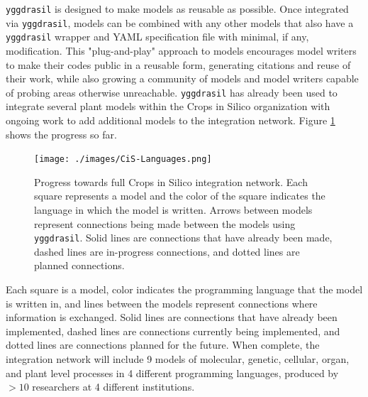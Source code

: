 \documentclass[journal]{IEEEtran}
\newcommand{\pkg}{{\tt yggdrasil}{}}
\begin{document}
{\pkg} is designed to make models as reusable as possible. Once integrated via {\pkg}, models can be combined with any other models that also have a {\pkg} wrapper and YAML specification file with minimal, if any, modification. This "plug-and-play" approach to models encourages model writers to make their codes public in a reusable form, generating citations and reuse of their work, while also growing a community of models and model writers capable of probing areas otherwise unreachable. 
%
{\pkg} has already been used to integrate several plant models within the Crops in Silico organization \citep{Marshall-Colon2017} with ongoing work to add additional models to the integration network. Figure \ref{fig:network} shows the progress so far. 
%
\ifinclfig
 	\begin{figure}[htbp]
	\begin{center}
	\texttt{[image: ./images/CiS-Languages.png]}
	\caption{Progress towards full Crops in Silico integration network. Each square represents a model and the color of the square indicates the language in which the model is written. Arrows between models represent connections being made between the models using {\pkg}. Solid lines are connections that have already been made, dashed lines are in-progress connections, and dotted lines are planned connections.}
	\label{fig:network}
	\end{center}
	\end{figure}
\fi
%
Each square is a model, color indicates the programming language that the model is written in, and lines between the models represent connections where information is exchanged. Solid lines are connections that have already been implemented, dashed lines are connections currently being implemented, and dotted lines are connections planned for the future. When complete, the integration network will include 9 models of molecular, genetic, cellular, organ, and plant level processes in 4 different programming languages, produced by $>10$ researchers at 4 different institutions. 
\end{document}
